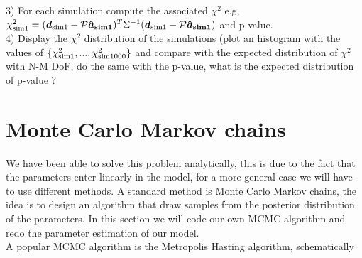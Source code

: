 \documentclass[a4paper]{article}
\begin{document}
3) For each simulation compute the associated $\chi^{2}$ e.g,  $\chi^{2}_{\rm sim 1 } = ({\bm d}_{\rm sim 1}  - {\cal P}\bm{\hat{a}_{\rm sim 1}})^{T} \Sigma^{-1} ({\bm d}_{\rm sim 1}  - {\cal P}\bm{\hat{a}_{\rm sim 1}})$ and p-value.  \\

4) Display the $\chi^{2}$ distribution of the simulations (plot an histogram with the values of $\{\chi^{2}_{\rm sim 1 }, ..., \chi^{2}_{\rm sim 1000  } \}$ and compare with the expected distribution of $\chi^{2}$ with N-M DoF, do the same with the p-value, what is the expected distribution of p-value ?


 \section{Monte Carlo Markov chains}

We have been able to solve this problem analytically, this is due to the fact that the parameters enter linearly in the model, for a more general case we will have to use different methods.
A standard method is Monte Carlo Markov chains, the idea is to design an algorithm that draw samples from the posterior distribution of the parameters. In this section we will code our own MCMC algorithm and redo the parameter estimation of our model. \\

A popular MCMC algorithm is the Metropolis Hasting algorithm, schematically
\end{document}
